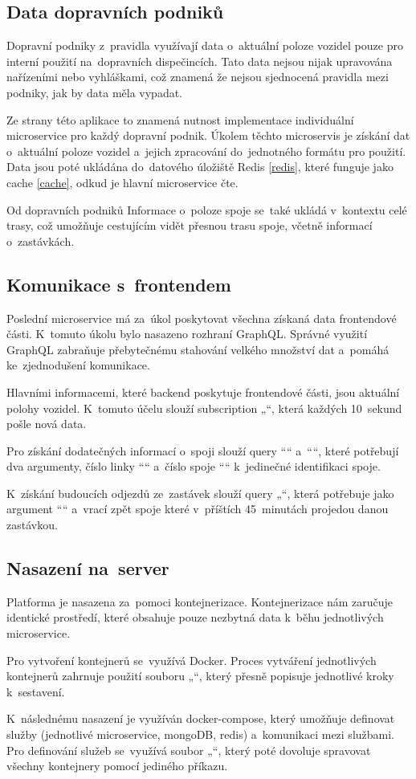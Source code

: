 \subsection {Data dopravních podniků}
Dopravní podniky z~pravidla využívají data o~aktuální poloze vozidel pouze pro interní použití na~dopravních dispečincích. Tato data nejsou nijak upravována nařízeními nebo vyhláškami, což znamená že nejsou sjednocená pravidla mezi podniky, jak by data měla vypadat.\par
Ze strany této aplikace to znamená nutnost implementace individuální microservice pro každý dopravní podnik. Úkolem těchto microservis je získání dat o~aktuální poloze vozidel a~jejich zpracování do~jednotného formátu pro použití. Data jsou poté ukládána do~datového úložiště Redis \ref{redis}, které funguje jako cache \ref{cache}, odkud je hlavní microservice čte.\par
Od dopravních podniků Informace o~poloze spoje se~také ukládá v~kontextu celé trasy, což umožňuje cestujícím vidět přesnou trasu spoje, včetně informací o~zastávkách.
\subsection {Komunikace s~frontendem}\label{mainBackend}
Poslední microservice má za~úkol poskytovat všechna získaná data frontendové části. K~tomuto úkolu bylo nasazeno rozhraní GraphQL. Správné využití GraphQL zabraňuje přebytečnému stahování velkého množství dat a~pomáhá ke~zjednodušení komunikace. \cite{graphqleasy} \par
Hlavními informacemi, které backend poskytuje frontendové části, jsou aktuální polohy vozidel. K~tomuto účelu slouží subscription „“, která každých 10~sekund pošle nová data.\par
Pro získání dodatečných informací o~spoji slouží query ““ \newline a~““, které potřebují dva argumenty, číslo linky ““ \newline a~číslo spoje ““ k~jedinečné identifikaci spoje.\par
K~získání budoucích odjezdů ze~zastávek slouží query „“, která potřebuje jako argument ““ a~vrací zpět spoje které v~příštích 45~minutách projedou danou zastávkou.
\newpage
\subsection{Nasazení na~server}
Platforma je nasazena za~pomoci kontejnerizace. Kontejnerizace nám zaručuje identické prostředí, které obsahuje pouze nezbytná data k~běhu jednotlivých microservice.\par
Pro vytvoření kontejnerů se~využívá Docker. Proces vytváření jednotlivých kontejnerů zahrnuje použití souboru „“, který přesně popisuje jednotlivé kroky k~sestavení.\par
K~následnému nasazení je využíván docker-compose, který umožňuje definovat služby (jednotlivé microservice, mongoDB, redis) a~komunikaci mezi službami. Pro definování služeb se~využívá soubor „“, který poté dovoluje spravovat všechny kontejnery pomocí jediného příkazu.
